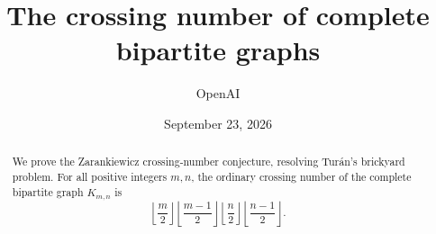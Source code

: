 \documentclass[11pt]{article}
\title{The crossing number of complete bipartite graphs}
\author{OpenAI}
\date{September 23, 2026}
\theoremstyle{remark}
\numberwithin{equation}{section}
\begin{document}
\maketitle
\begin{abstract}
We prove the Zarankiewicz crossing-number conjecture, resolving Tur\'an's
brickyard problem. For all positive integers $m,n$, the ordinary crossing
number of the complete bipartite graph $K_{m,n}$ is
\[
 \left\lfloor\frac m2\right\rfloor
 \left\lfloor\frac{m-1}{2}\right\rfloor
 \left\lfloor\frac n2\right\rfloor
 \left\lfloor\frac{n-1}{2}\right\rfloor.
\]
\end{abstract}







\appendix


\begingroup
\small
\raggedright


\endgroup
\end{document}
